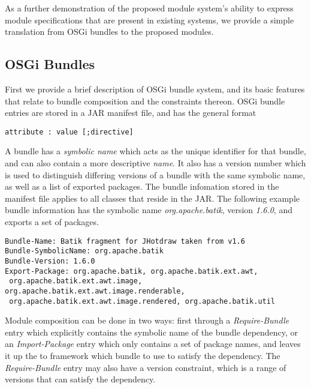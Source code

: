 As a further demonstration of the proposed module system's ability to 
express module specifications that are present in existing systems, 
we provide a simple translation from OSGi bundles to the proposed modules.

\subsection{OSGi Bundles}

First we provide a brief description of OSGi bundle system, and its basic
features that relate to bundle composition and the constraints thereon.
OSGi bundle entries are stored in a JAR manifest file, and has the
general format

\begin{lstlisting}
attribute : value [;directive]
\end{lstlisting}

A bundle has a \textit{symbolic name} which acts as the unique identifier for that bundle, 
and can also contain a more descriptive \textit{name}.
It also has a version number which is used to distinguish differing versions of
a bundle with the same symbolic name, as well as a list of exported packages.
 The bundle infomation stored in the
manifest file applies to all classes that reside in the JAR. The following example
bundle information has the symbolic name \textit{org.apache.batik}, version \textit{1.6.0},
and exports a set of packages.

\begin{lstlisting}[caption=Basic OSGi bundle]
Bundle-Name: Batik fragment for JHotdraw taken from v1.6
Bundle-SymbolicName: org.apache.batik
Bundle-Version: 1.6.0
Export-Package: org.apache.batik, org.apache.batik.ext.awt,
 org.apache.batik.ext.awt.image, org.apache.batik.ext.awt.image.renderable,
 org.apache.batik.ext.awt.image.rendered, org.apache.batik.util
\end{lstlisting}

Module composition can be done in two ways: first through a \textit{Require-Bundle}
entry which explicitly contains the symbolic name of the bundle dependency, or an
\textit{Import-Package} entry which only contains a set of package names, and leaves
it up the to framework which bundle to use to satisfy the dependency. The \textit{Require-Bundle}
entry may also have a version constraint, which is a range of versions that can satisfy
the dependency.

